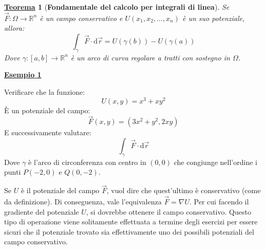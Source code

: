 \documentclass[a4paper]{article}
\newtheorem{theorem}{\textcolor{Red3}{\underline{Teorema}}}
\newcommand{\example}[1]{\textcolor{Green4}{\textbf{#1}}}
\begin{document}
	\begin{theorem}[\textbf{Fondamentale del calcolo per integrali di linea}]\label{theorem: fondamentale del calcolo per integrali di linea}
		Se $\overset{\rightarrow}{F}: \Omega \rightarrow \mathbb{R}^{n}$ è un campo conservativo e $U\left(x_{1}, x_{2}, \dots, x_{n}\right)$ è un suo potenziale, allora:
		\begin{equation}
			\displaystyle\int_{\gamma} \overset{\rightarrow}{F} \cdot \mathrm{d}\overset{\rightarrow}{r} = U\left(\gamma\left(b\right)\right) - U\left(\gamma\left(a\right)\right)
		\end{equation}
		Dove $\gamma : \left[a,b\right] \rightarrow \mathbb{R}^{n}$ è un arco di curva regolare a tratti con sostegno in $\Omega$.
	\end{theorem}

	\begin{flushleft}
		\example{\underline{Esempio 1}}
	\end{flushleft}
	Verificare che la funzione:
	\begin{equation*}
		U\left(x,y\right) = x^{3} + xy^{2}
	\end{equation*}
	È un potenziale del campo:
	\begin{equation*}
		\overset{\rightarrow}{F}\left(x,y\right) = \left(3x^{2}+y^{2}, 2xy\right)
	\end{equation*}
	E successivamente valutare:
	\begin{equation*}
		\displaystyle\int_{\gamma} \overset{\rightarrow}{F} \cdot \mathrm{d}\overset{\rightarrow}{r}
	\end{equation*}
	Dove $\gamma$ è l'arco di circonferenza con centro in $\left(0,0\right)$ che congiunge nell'ordine i punti $P\left(-2,0\right)$ e $Q\left(0,-2\right)$.\newline

	\noindent
	Se $U$ è il potenziale del campo $\overset{\rightarrow}{F}$, vuol dire che quest'ultimo è conservativo  (come da definizione). Di conseguenza, vale l'equivalenza $\overset{\rightarrow}{F} = \nabla U$. Per cui facendo il gradiente del potenziale $U$, si dovrebbe ottenere il campo conservativo. Questo tipo di operazione viene solitamente effettuata a termine degli esercizi per essere sicuri che il potenziale trovato sia effettivamente uno dei possibili potenziali del campo conservativo.\newline
\end{document}
